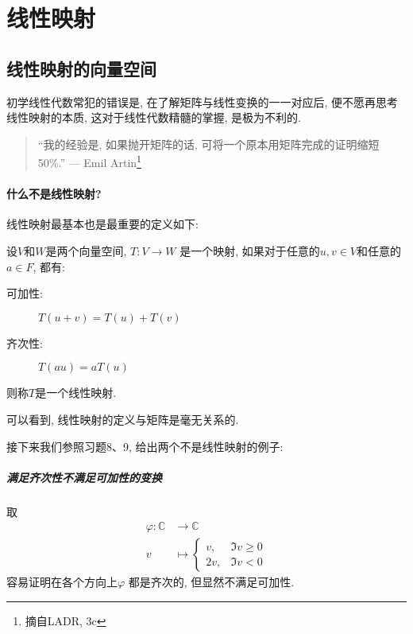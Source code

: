 \chapter{线性映射}
\section{线性映射的向量空间}
初学线性代数常犯的错误是, 在了解矩阵与线性变换的一一对应后, 便不愿再思考线性映射的本质, 这对于线性代数精髓的掌握, 是极为不利的.
\begin{quote}
    ``我的经验是, 如果抛开矩阵的话, 可将一个原本用矩阵完成的证明缩短 50\%.''
    \hfill --- Emil Artin\footnote{摘自LADR, 3c}
\end{quote}
\subsubsection{什么不是线性映射?}
线性映射最基本也是最重要的定义如下:
\begin{definition}
    设\(V\)和\(W\)是两个向量空间, \(T: V \to W\) 是一个映射, 如果对于任意的\(u,
    v \in V\)和任意的\(a \in F\), 都有:
    \begin{description}
        \item[可加性:] \(T(u+v)=T(u)+T(v)\)
        \item[齐次性:] \(T(a u) = a T(u)\)
    \end{description}
    则称\(T\)是一个线性映射.
\end{definition}
可以看到, 线性映射的定义与矩阵是毫无关系的.

接下来我们参照习题8、9, 给出两个不是线性映射的例子:

\paragraph{满足齐次性不满足可加性的变换}
取
\begin{align*}
    \varphi: \mathbb{C} &\to \mathbb{C} \\
    v &\mapsto
    \begin{cases}
        v, &\Im v \geq 0 \\
        2v, &\Im v < 0
    \end{cases}
\end{align*}
容易证明在各个方向上\(\varphi\) 都是齐次的, 但显然不满足可加性.

